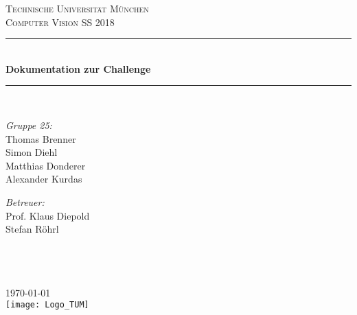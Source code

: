 \begin{titlepage}
    \newcommand{\HRule}{\rule{\linewidth}{0.5mm}}

    \center

    \textsc{\LARGE Technische Universität München}\\[1.5cm]
    \textsc{\Large Computer Vision SS 2018}\\[0.5cm]

    \HRule \\[0.7cm]
    { \huge \bfseries Dokumentation zur Challenge}\\[0.4cm]
    \HRule \\[1.5cm]

    \begin{minipage}{0.3\textwidth}
    \raggedright
    \emph{Gruppe 25:}\\
    Thomas Brenner\\
    Simon Diehl\\
    Matthias Donderer\\
    Alexander Kurdas
    \end{minipage}
	\hspace{2cm}
    \begin{minipage}{0.3\textwidth}
	\raggedright
    \emph{Betreuer:}\\
    Prof. Klaus Diepold\\
    Stefan Röhrl \\
    ~\\
    ~
    \end{minipage}\\[4cm]

    {\large \today}\\[3cm]

    \texttt{[image: Logo\_TUM]}
\end{titlepage}
